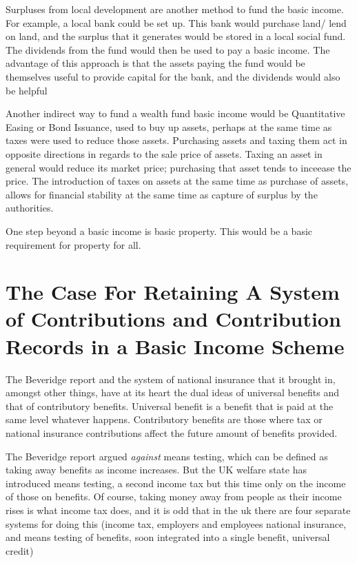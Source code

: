 \documentclass[]{tufte-handout}
\begin{document}
Surpluses from local development are another method to fund the basic
income. For example, a local bank could be set up. This bank would
purchase land/ lend on land, and the surplus that it generates would be
stored in a local social fund. The dividends from the fund would then be
used to pay a basic income. The advantage of this approach is that the
assets paying the fund would be themselves useful to provide capital for
the bank, and the dividends would also be helpful

Another indirect way to fund a wealth fund basic income would be
Quantitative Easing or Bond Issuance, used to buy up assets, perhaps at
the same time as taxes were used to reduce those assets. Purchasing
assets and taxing them act in opposite directions in regards to the sale
price of assets. Taxing an asset in general would reduce its market
price; purchasing that asset tends to inceease the price. The
introduction of taxes on assets at the same time as purchase of assets,
allows for financial stability at the same time as capture of surplus by
the authorities.

One step beyond a basic income is basic property. This would be a basic
requirement for property for all.

\hypertarget{the-case-for-retaining-a-system-of-contributions-and-contribution-records-in-a-basic-income-scheme}{%
\section{The Case For Retaining A System of Contributions and
Contribution Records in a Basic Income
Scheme}\label{the-case-for-retaining-a-system-of-contributions-and-contribution-records-in-a-basic-income-scheme}}

The Beveridge report and the system of national insurance that it
brought in, amongst other things, have at its heart the dual ideas of
universal benefits and that of contributory benefits. Universal benefit
is a benefit that is paid at the same level whatever happens.
Contributory benefits are those where tax or national insurance
contributions affect the future amount of benefits provided.

The Beveridge report argued \emph{against} means testing, which can be
defined as taking away benefits as income increases. But the UK welfare
state has introduced means testing, a second income tax but this time
only on the income of those on benefits. Of course, taking money away
from people as their income rises is what income tax does, and it is odd
that in the uk there are four separate systems for doing this (income
tax, employers and employees national insurance, and means testing of
benefits, soon integrated into a single benefit, universal credit)
\end{document}
